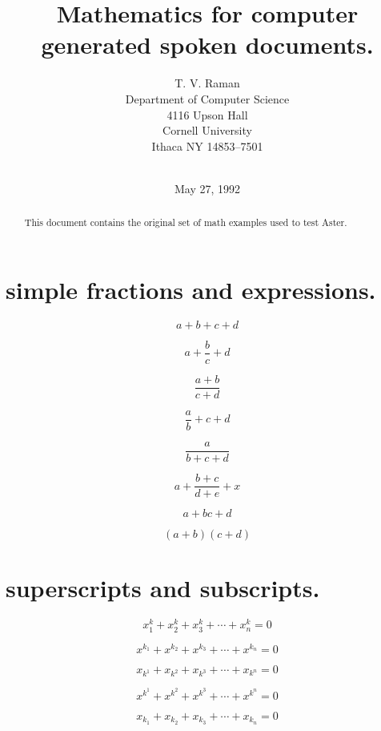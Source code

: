 

\begin{abstract}
  This document contains the original set of math examples used to
  test Aster.
\end{abstract}

\title{Mathematics for computer generated spoken documents.}
\author{T. V. Raman\\
Department of Computer Science\\
4116 Upson Hall\\
Cornell University\\
Ithaca NY 14853--7501\\
\\
}
\date{May 27, 1992}
\maketitle


\section{simple fractions and expressions. }

$$a+b+c+d$$



$$a+\frac{b}{c} +d$$


$$\frac{a+b}{c+d}$$


$$\frac{a}{b}+c+d$$


$$\frac{a}{b+c+d}$$


$$a+\frac{b+c}{d+e}+x$$


$$a+bc+d$$


$$(a+b)(c+d)$$


\section{superscripts and subscripts.  }


$$x^k_1 +x^k_2 + x^k_3 + \cdots + x^k_n = 0$$

$$x^{k_1} + x^{k_2} + x^{k_3} + \cdots + x^{k_n} = 0$$

$$x_{k^1}+x_{k^2}+x_{k^3}+\cdots+x_{k^n}=0$$

$$x^{k^1}+x^{k^2}+x^{k^3}+\cdots+x^{k^n}=0$$

$$x_{k_1}+x_{k_2}+x_{k_3}+\cdots+x_{k_n}=0$$

